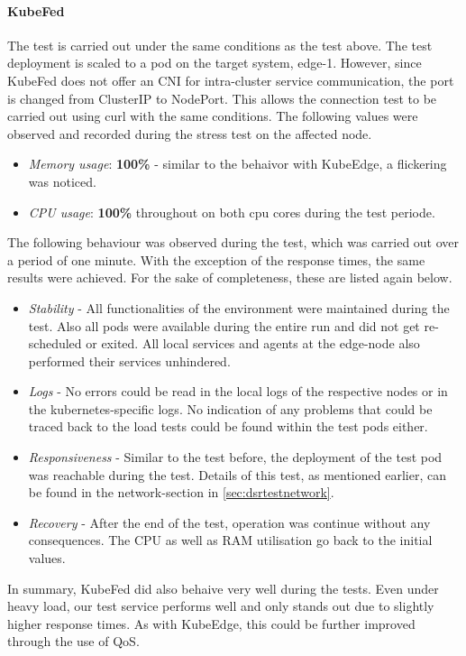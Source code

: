 \documentclass[MSC,Master,english]{twbook}%
\begin{document}
\paragraph{KubeFed} The test is carried out under the same conditions as the test above. The test deployment is scaled to a pod on the target system, edge-1. However, since KubeFed does not offer an \ac{CNI} for intra-cluster service communication, the port is changed from ClusterIP to NodePort. This allows the connection test to be carried out using curl with the same conditions. The following values were observed and recorded during the stress test on the affected node.

\begin{itemize}
    \item \textit{Memory usage}: \textbf{100\%} - similar to the behaivor with KubeEdge, a flickering was noticed.
    \item \textit{CPU usage}: \textbf{100\%} throughout on both cpu cores during the test periode. 
\end{itemize}

The following behaviour was observed during the test, which was carried out over a period of one minute. With the exception of the response times, the same results were achieved. For the sake of completeness, these are listed again below.

\begin{itemize} 
    \item \textit{Stability} - All functionalities of the environment were maintained during the test. Also all pods were available during the entire run and did not get re-scheduled or exited. All local services and agents at the edge-node also performed their services unhindered.
    \item \textit{Logs} - No errors could be read in the local logs of the respective nodes or in the kubernetes-specific logs. No indication of any problems that could be traced back to the load tests could be found within the test pods either.
    \item \textit{Responsiveness} - Similar to the test before, the deployment of the test pod was reachable during the test. Details of this test, as mentioned earlier, can be found in the network-section in \autoref{sec:dsrtestnetwork}.
    \item \textit{Recovery} - After the end of the test, operation was continue without any consequences. The CPU as well as RAM utilisation go back to the initial values. 
\end{itemize}
In summary, KubeFed did also behaive very well during the tests. Even under heavy load, our test service performs well and only stands out due to slightly higher response times. As with KubeEdge, this could be further improved through the use of \ac{QoS}.
\end{document}
